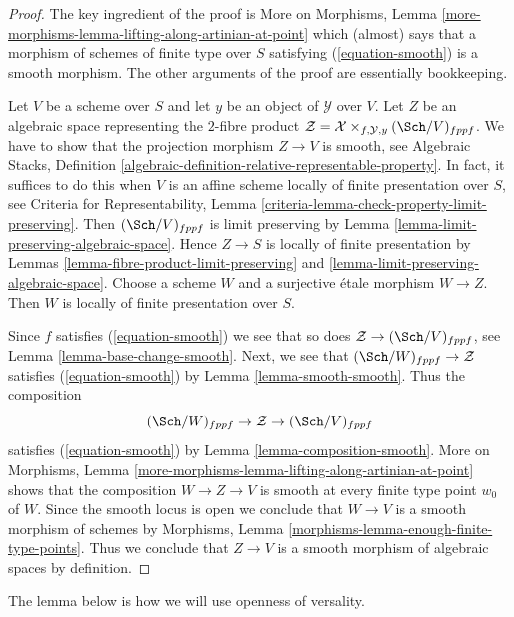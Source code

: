 \begin{proof}
The key ingredient of the proof is More on Morphisms, Lemma
\ref{more-morphisms-lemma-lifting-along-artinian-at-point}
which (almost) says that a morphism of schemes of finite type over $S$
satisfying (\ref{equation-smooth}) is a smooth morphism. The other
arguments of the proof are essentially bookkeeping.

\medskip\noindent
Let $V$ be a scheme over $S$ and let $y$ be an object of $\mathcal{Y}$ over
$V$. Let $Z$ be an algebraic space representing the $2$-fibre product
$\mathcal{Z} = \mathcal{X} \times_{f, \mathcal{Y}, y} (\Sch/V)_{fppf}$.
We have to show that the projection morphism $Z \to V$ is smooth, see
Algebraic Stacks, Definition
\ref{algebraic-definition-relative-representable-property}.
In fact, it suffices to do this when $V$ is an affine scheme
locally of finite presentation over $S$, see
Criteria for Representability, Lemma
\ref{criteria-lemma-check-property-limit-preserving}.
Then $(\Sch/V)_{fppf}$ is limit preserving by
Lemma \ref{lemma-limit-preserving-algebraic-space}.
Hence $Z \to S$ is locally of finite presentation by
Lemmas \ref{lemma-fibre-product-limit-preserving} and
\ref{lemma-limit-preserving-algebraic-space}.
Choose a scheme $W$ and a surjective \'etale morphism $W \to Z$.
Then $W$ is locally of finite presentation over $S$.

\medskip\noindent
Since $f$ satisfies (\ref{equation-smooth}) we see that so does
$\mathcal{Z} \to (\Sch/V)_{fppf}$, see Lemma \ref{lemma-base-change-smooth}.
Next, we see that $(\Sch/W)_{fppf} \to \mathcal{Z}$ satisfies
(\ref{equation-smooth}) by Lemma \ref{lemma-smooth-smooth}.
Thus the composition
$$
(\Sch/W)_{fppf} \to \mathcal{Z} \to (\Sch/V)_{fppf}
$$
satisfies (\ref{equation-smooth}) by Lemma \ref{lemma-composition-smooth}.
More on Morphisms, Lemma
\ref{more-morphisms-lemma-lifting-along-artinian-at-point}
shows that the composition $W \to Z \to V$ is smooth at every finite type
point $w_0$ of $W$. Since the smooth locus is open we conclude
that $W \to V$ is a smooth morphism of schemes by
Morphisms, Lemma \ref{morphisms-lemma-enough-finite-type-points}.
Thus we conclude that $Z \to V$ is a smooth morphism
of algebraic spaces by definition.
\end{proof}

\noindent
The lemma below is how we will use openness of versality.

